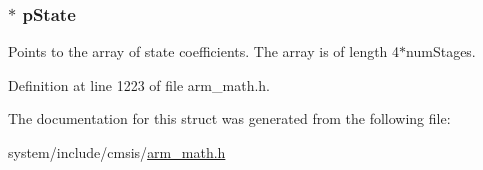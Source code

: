 \subsubsection[{\texorpdfstring{p\+State}{pState}}]{$\ast$ p\+State}\hypertarget{structarm__biquad__casd__df1__inst__q15_ae29dfdb736374fcddaeaec4b7770170c}{}\label{structarm__biquad__casd__df1__inst__q15_ae29dfdb736374fcddaeaec4b7770170c}
Points to the array of state coefficients. The array is of length 4$\ast$num\+Stages. 

Definition at line 1223 of file arm\+\_\+math.\+h.



The documentation for this struct was generated from the following file\+:\begin{DoxyCompactItemize}
\item 
system/include/cmsis/\hyperlink{arm__math_8h}{arm\+\_\+math.\+h}\end{DoxyCompactItemize}
